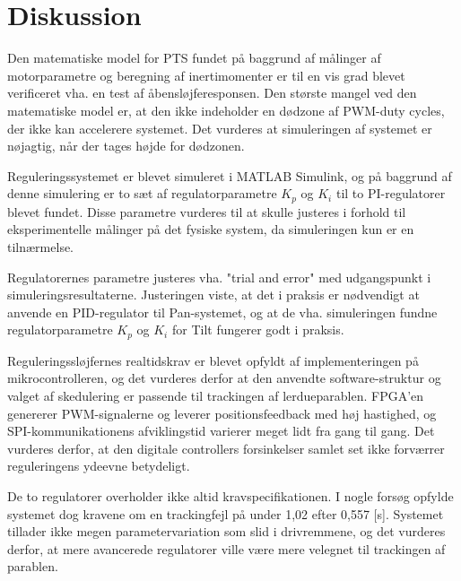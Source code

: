 \section{Diskussion}
\label{sec:diskussion}
Den matematiske model for PTS fundet på baggrund af
målinger af motorparametre og beregning af inertimomenter
er til en vis grad blevet verificeret vha. en test af åbensløjferesponsen.
Den største mangel ved den matematiske model er, at den ikke indeholder en dødzone
af PWM-duty cycles, der ikke kan accelerere systemet. Det vurderes
at simuleringen af systemet er nøjagtig, når der tages højde for dødzonen.

Reguleringssystemet er blevet simuleret i MATLAB Simulink, og på baggrund af denne simulering
er to sæt af regulatorparametre \(K_p\) og \(K_i\) til to PI-regulatorer blevet fundet.
Disse parametre vurderes til at skulle justeres
i forhold til eksperimentelle målinger på det fysiske system, da simuleringen kun er en tilnærmelse.

Regulatorernes parametre justeres vha. "trial and error"
med udgangspunkt i simuleringsresultaterne.
Justeringen viste, at det i praksis er nødvendigt at anvende en PID-regulator til Pan-systemet,
og at de vha. simuleringen fundne regulatorparametre \(K_p\) og \(K_i\) for Tilt fungerer godt i praksis.


Reguleringssløjfernes realtidskrav er blevet opfyldt af implementeringen på mikrocontrolleren,
og det vurderes derfor at den anvendte software-struktur og valget af skedulering
er passende til trackingen af lerdueparablen.
FPGA'en genererer PWM-signalerne og leverer positionsfeedback med høj hastighed,
og SPI-kommunikationens afviklingstid varierer meget lidt fra gang til gang.
Det vurderes derfor, at den digitale controllers forsinkelser samlet set ikke forværrer
reguleringens ydeevne betydeligt.

De to regulatorer overholder ikke altid kravspecifikationen.
I nogle forsøg opfylde systemet dog kravene om en trackingfejl på under 1,02\degree{}
efter 0,557 [s].
Systemet tillader ikke megen parametervariation
som slid i drivremmene,
og det vurderes derfor, at mere avancerede regulatorer ville være mere velegnet til trackingen
af parablen.
